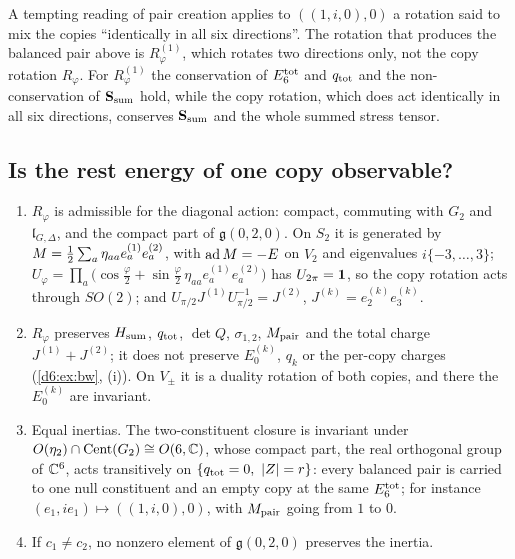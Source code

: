 A tempting reading of pair creation applies to $((1,i,0),0)$ a rotation said to mix the copies ``identically in all six directions''. The rotation
that produces the balanced pair above is $R^{(1)}_\varphi$, which rotates two directions only, not the copy rotation $R_\varphi$. For $R^{(1)}_\varphi$ the
conservation of $E_6^{\rm tot}$ and $q_{\rm tot}$ and the non-conservation of $\mathbf S_{\rm sum}$ hold, while the copy rotation, which does act identically
in all six directions, conserves $\mathbf S_{\rm sum}$ and the whole summed stress tensor.

\subsection{Is the rest energy of one copy observable?}
\label{d6:sec:gauge}

\begin{proposition}
\label{d6:prop:gauge}
\begin{enumerate}[label=(\roman*),leftmargin=2.2em]
\item $R_\varphi$ is admissible for the diagonal action: compact, commuting with $G_2$ and $\mathfrak l_{G,\Delta}$, and the compact part of
$\mathfrak g(0,2,0)$. On $S_2$ it is generated by $M=\tfrac12\sum_a\eta_{aa}e^{(1)}_ae^{(2)}_a$, with $\operatorname{ad} M=-E$ on $V_2$ and eigenvalues
$i\{-3,\dots,3\}$; $U_\varphi=\prod_a\bigl(\cos\tfrac\varphi2+\sin\tfrac\varphi2\,\eta_{aa}e^{(1)}_ae^{(2)}_a\bigr)$ has $U_{2\pi}=\mathbf 1$, so the copy rotation
acts through $SO(2)$; and $U_{\pi/2}J^{(1)}U_{\pi/2}^{-1}=J^{(2)}$, $J^{(k)}=e^{(k)}_2e^{(k)}_3$.
\item $R_\varphi$ preserves $H_{\rm sum}$, $q_{\rm tot}$, $\det Q$, $\sigma_{1,2}$, $M_{\rm pair}$ and the total charge $J^{(1)}+J^{(2)}$; it does not
preserve $E_0^{(k)}$, $q_k$ or the per-copy charges (\cref{d6:ex:bw}, (i)). On $V_\pm$ it is a duality rotation of both copies, and there the
$E_0^{(k)}$ are invariant.
\item Equal inertias. The two-constituent closure is invariant under $O(\eta_2)\cap\operatorname{Cent}(G_2)\cong O(6,\mathbb{C})$, whose compact part, the real
orthogonal group of $\mathbb{C}^6$, acts transitively on $\{q_{\rm tot}=0,\ |Z|=r\}$: every balanced pair is carried to one null constituent and an empty
copy at the same $E_6^{\rm tot}$; for instance $(e_1,ie_1)\mapsto((1,i,0),0)$, with $M_{\rm pair}$ going from $1$ to $0$.
\item If $c_1\neq c_2$, no nonzero element of $\mathfrak g(0,2,0)$ preserves the inertia.
\end{enumerate}
\end{proposition}


